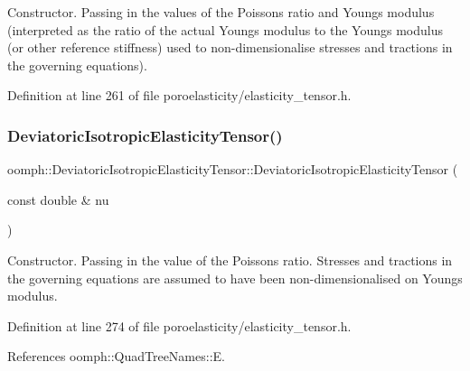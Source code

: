 Constructor. Passing in the values of the Poisson\textquotesingle{}s ratio and Young\textquotesingle{}s modulus (interpreted as the ratio of the actual Young\textquotesingle{}s modulus to the Young\textquotesingle{}s modulus (or other reference stiffness) used to non-\/dimensionalise stresses and tractions in the governing equations). 



Definition at line 261 of file poroelasticity/elasticity\+\_\+tensor.\+h.

\mbox{\label{classoomph_1_1DeviatoricIsotropicElasticityTensor_a09fec2c25d55c5603723f2ab2531f78a}} 
\subsubsection{\texorpdfstring{Deviatoric\+Isotropic\+Elasticity\+Tensor()}{DeviatoricIsotropicElasticityTensor()}\hspace{0.1cm}{\footnotesize\ttfamily [3/4]}}
{\footnotesize\ttfamily oomph\+::\+Deviatoric\+Isotropic\+Elasticity\+Tensor\+::\+Deviatoric\+Isotropic\+Elasticity\+Tensor (\begin{DoxyParamCaption}\item[{const double \&}]{nu }\end{DoxyParamCaption})\hspace{0.3cm}{\ttfamily [inline]}}



Constructor. Passing in the value of the Poisson\textquotesingle{}s ratio. Stresses and tractions in the governing equations are assumed to have been non-\/dimensionalised on Young\textquotesingle{}s modulus. 



Definition at line 274 of file poroelasticity/elasticity\+\_\+tensor.\+h.



References oomph\+::\+Quad\+Tree\+Names\+::E.

\mbox{\label{classoomph_1_1DeviatoricIsotropicElasticityTensor_aeed1da3ce892934b38ce4fda23c7f21c}} 
